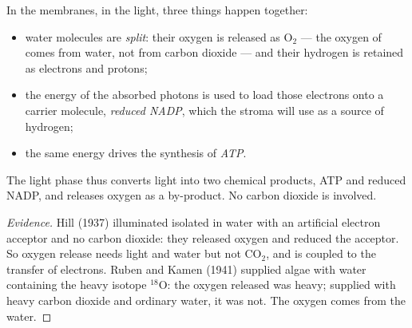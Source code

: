 \begin{proposition}\label{prop:g12:photosynthesis:lightphase}
In the  membranes, in the light, three things happen
together:
\begin{itemize}
  \item water molecules are \emph{split}: their oxygen is released as
        $\mathrm{O_2}$ --- the oxygen of  comes from
        water, not from carbon dioxide --- and their hydrogen is
        retained as electrons and protons;
  \item the energy of the absorbed photons is used to load those
        electrons onto a carrier molecule, \emph{reduced NADP}, which
        the stroma will use as a source of hydrogen;
  \item the same energy drives the synthesis of \emph{ATP}.
\end{itemize}
The light phase thus converts light into two chemical products, ATP
and reduced NADP, and releases oxygen as a by-product. No carbon
dioxide is involved.
\end{proposition}
\begin{proof}[Evidence]
Hill (1937) illuminated isolated  in water with an
artificial electron acceptor and no carbon dioxide: they released
oxygen and reduced the acceptor. So oxygen release needs light and
water but not $\mathrm{CO_2}$, and is coupled to the transfer of
electrons. Ruben and Kamen (1941) supplied algae with water containing
the heavy isotope $^{18}$O: the oxygen released was heavy; supplied
with heavy carbon dioxide and ordinary water, it was not. The oxygen
comes from the water.
\end{proof}

